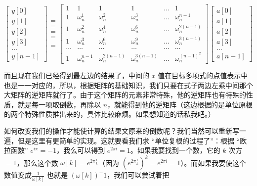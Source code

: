 $$
 \begin{bmatrix}y[0] \\ y[1] \\ y[2] \\ y[3] \\ \dots \\ y[n-1] \end{bmatrix}
\begin{matrix}= \\ = \\ = \\ = \\ \\ = \end{matrix}
\begin{bmatrix}1 & 1 & 1 & 1 & \dots & 1 \\
1 & \omega_n^1 & \omega_n^2 & \omega_n^3 & \dots & \omega_n^{n-1} \\
1 & \omega_n^2 & \omega_n^4 & \omega_n^6 & \dots & \omega_n^{2(n-1)} \\
1 & \omega_n^3 & \omega_n^6 & \omega_n^9 & \dots & \omega_n^{3(n-1)} \\
\dots & \dots & \dots & \dots & \dots & \dots \\
1 & \omega_n^{n-1} & \omega_n^{2(n-1)} & \omega_n^{3(n-1)} & \dots & \omega_n^{(n-1)^2} \end{bmatrix}
\begin{bmatrix} a[0] \\ a[1] \\ a[2] \\ a[3] \\ \dots \\ a[n-1] \end{bmatrix} 
$$

而且现在我们已经得到最左边的结果了，中间的 $x$ 值在目标多项式的点值表示中也是一一对应的，所以，根据矩阵的基础知识，我们只要在式子两边左乘中间那个大矩阵的逆矩阵就行了。由于这个矩阵的元素非常特殊，他的逆矩阵也有特殊的性质，就是每一项取倒数，再除以 $n$，就能得到他的逆矩阵（这边根据的是单位原根的两个特殊性质推出来的，具体比较麻烦。如果想知道的话私我吧。）

如何改变我们的操作才能使计算的结果文原来的倒数呢？我们当然可以重新写一遍，但是这里有更简单的实现。这就要看我们求 “单位复根的过程了”：根据 “欧拉函数” $e^{i\pi}=-1$，我么可以得到 $e^{2\pi i}=1$。如果我要找到一个数，它的 $k$ 次方 $= 1$，那么这个数 $\omega[k]=e^{2\pi \frac{i}{k}}$（因为 $(e^{2\pi \frac{i}{k}})^k=e^{2\pi i}=1$）。而如果我要使这个数值变成$\frac{1}{\omega[k]}$ 也就是 $(\omega[k])^-1$，我们可以尝试着把


